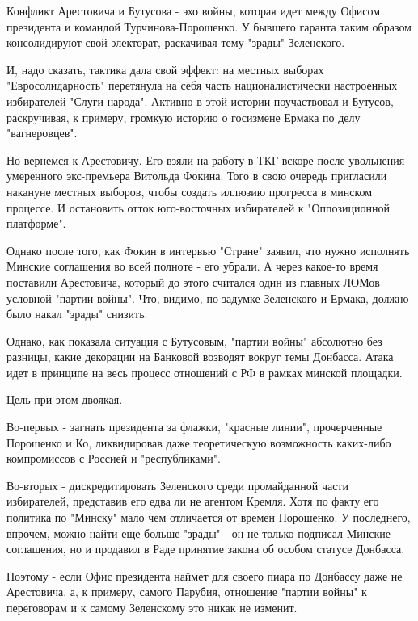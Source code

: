 Конфликт Арестовича и Бутусова - эхо войны, которая идет между Офисом
президента и командой Турчинова-Порошенко. У бывшего гаранта таким образом
консолидируют свой электорат, раскачивая тему "зрады" Зеленского.

И, надо сказать, тактика дала свой эффект: на местных выборах
"Евросолидарность" перетянула на себя часть националистически настроенных
избирателей "Слуги народа". Активно в этой истории поучаствовал и Бутусов,
раскручивая, к примеру, громкую историю о госизмене Ермака по делу
"вагнеровцев". 

Но вернемся к Арестовичу. Его взяли на работу в ТКГ вскоре после
увольнения умеренного экс-премьера Витольда Фокина. Того в свою очередь
пригласили накануне местных выборов, чтобы создать иллюзию прогресса в
минском процессе. И остановить отток юго-восточных избирателей к
"Оппозиционной платформе". 

Однако после того, как Фокин в интервью "Стране" заявил, что нужно
исполнять Минские соглашения во всей полноте - его убрали. А через
какое-то время поставили Арестовича, который до этого считался один из
главных ЛОМов условной "партии войны". Что, видимо, по задумке Зеленского
и Ермака, должно было накал "зрады" снизить. 

Однако, как показала ситуация с Бутусовым, "партии войны" абсолютно без
разницы, какие декорации на Банковой возводят вокруг темы Донбасса. Атака
идет в принципе на весь процесс отношений с РФ в рамках минской площадки.

Цель при этом двоякая.

Во-первых - загнать президента за флажки, "красные линии", прочерченные
Порошенко и Ко, ликвидировав даже теоретическую возможность каких-либо
компромиссов с Россией и "республиками". 

Во-вторых - дискредитировать Зеленского среди промайданной части
избирателей, представив его едва ли не агентом Кремля. Хотя по факту его
политика по "Минску" мало чем отличается от времен Порошенко. У
последнего, впрочем, можно найти еще больше "зрады" - он не только
подписал Минские соглашения, но и продавил в Раде принятие закона об
особом статусе Донбасса. 

Поэтому - если Офис президента наймет для своего пиара по Донбассу даже не
Арестовича, а, к примеру, самого Парубия, отношение "партии войны" к
переговорам и к самому Зеленскому это никак не изменит.
